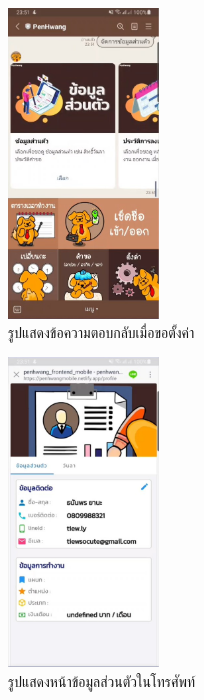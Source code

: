 \begin{figure}
  \begin{center}
    \includegraphics[width=4cm,keepaspectratio]{./images/message_setting.jpg}
  \end{center}
  \caption[รูปแสดงข้อความตอบกลับเมื่อขอตั้งค่า]{รูปแสดงข้อความตอบกลับเมื่อขอตั้งค่า} 
  \label{fig:message_setting}
\end{figure}

\begin{figure}
  \begin{center}
    \includegraphics[width=4cm,keepaspectratio]{./images/line_personal_info.jpg}
  \end{center}
  \caption[รูปแสดงหน้าข้อมูลส่วนตัวในโทรศัพท์]{รูปแสดงหน้าข้อมูลส่วนตัวในโทรศัพท์} 
  \label{fig:line_personal_info}
\end{figure} 
 
